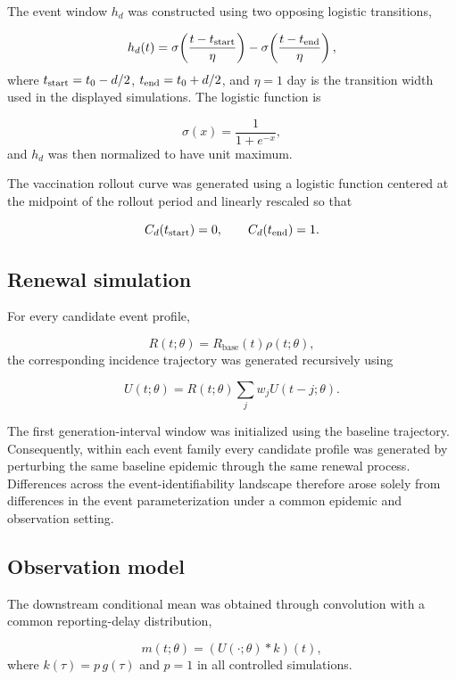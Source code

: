 The event window \(h_d\) was constructed using two opposing logistic transitions,

\[
h_d(t)
=
\sigma\!\left(
\frac{t-t_{\rm start}}{\eta}
\right)
-
\sigma\!\left(
\frac{t-t_{\rm end}}{\eta}
\right),
\]
where \(t_{\rm start}=t_0-d/2\), \(t_{\rm end}=t_0+d/2\), and \(\eta=1\) day is the transition width used in the displayed simulations. The logistic function is

\[
\sigma(x)
=
\frac1{1+e^{-x}},
\]
and \(h_d\) was then normalized to have unit maximum.

The vaccination rollout curve was generated using a logistic function centered at the midpoint of the rollout period and linearly rescaled so that

\[
C_d(t_{\rm start})=0,
\qquad
C_d(t_{\rm end})=1.
\]



\subsection{Renewal simulation}

For every candidate event profile,

\[
R(t;\theta)
=
R_{\mathrm{base}}(t)\rho(t;\theta),
\]
the corresponding incidence trajectory was generated recursively using

\begin{equation}
U(t;\theta)
=
R(t;\theta)
\sum_j
w_j
U(t-j;\theta).
\end{equation}

The first generation-interval window was initialized using the baseline trajectory. Consequently, within each event family every candidate profile was generated by perturbing the same baseline epidemic through the same renewal process. Differences across the event-identifiability landscape therefore arose solely from differences in the event parameterization under a common epidemic and observation setting.



\subsection{Observation model}

The downstream conditional mean was obtained through convolution with a common reporting-delay distribution,

\[
m(t;\theta)
=
(U(\cdot;\theta)*k)(t),
\]
where \(k(\tau)=p\,g(\tau)\) and \(p=1\) in all controlled simulations.

